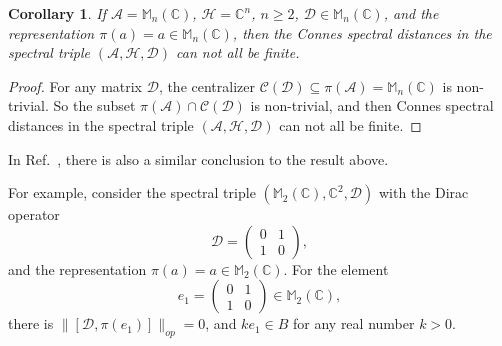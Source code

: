 \documentclass[a4paper,12pt]{article}
\newtheorem{corollary}{Corollary}
\begin{document}
\begin{corollary}
  If $\mathcal{A}=\mathbb{M}_n (\mathbb{C})$, $\mathcal{H}=\mathbb{C}^n$, $n
  \geqslant 2$, $\mathcal{D} \in \mathbb{M}_n (\mathbb{C})$, and the
  representation $\pi (a) = a \in \mathbb{M}_n (\mathbb{C})$, then the Connes
  spectral distances in the spectral triple $(\mathcal{A}, \mathcal{H},
  \mathcal{D})$ can not all be finite.
\end{corollary}

\begin{proof}
For any matrix $\mathcal{D}$, the centralizer
$\mathcal{C} (\mathcal{D}) \subseteq \pi (\mathcal{A}) =\mathbb{M}_n
(\mathbb{C})$ is non-trivial. So the subset $\pi (\mathcal{A}) \cap
\mathcal{C} (\mathcal{D})$ is non-trivial, and then Connes spectral distances
in the spectral triple $(\mathcal{A}, \mathcal{H}, \mathcal{D})$ can not all
be finite.
\end{proof}

In Ref.~\cite{Martinettip}, there is also a similar conclusion to the result above.

For example, consider the spectral triple $(\mathbb{M}_2 (\mathbb{C}),
\mathbb{C}^2, \mathcal{D})$ with the Dirac operator
\begin{equation}
  \mathcal{D} = \left(\begin{array}{cc}
    0 & 1\\
    1 & 0
  \end{array}\right),
\end{equation}
and the representation $\pi (a) = a \in \mathbb{M}_2 (\mathbb{C})$. For the element
\begin{equation}
  e_1 = \left(\begin{array}{cc}
    0 & 1\\
    1 & 0
  \end{array}\right) \in \mathbb{M}_2 (\mathbb{C}),
\end{equation}
there is $\|[\mathcal{D}, \pi (e_1)]\|_{op} = 0$, and $k e_1 \in B$ for
any real number $k > 0$.
\end{document}

